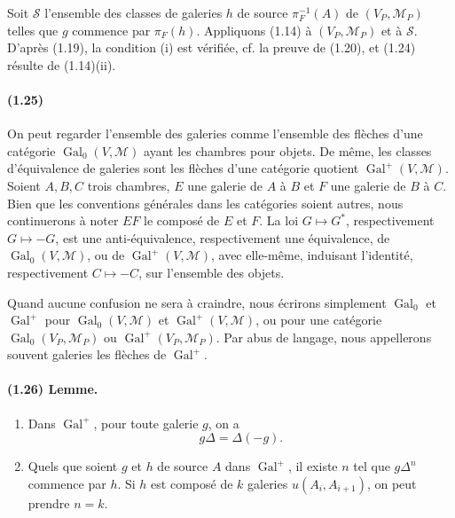 \documentclass[10pt]{article}
\begin{document}
Soit \(\mathcal S\) l'ensemble des classes de galeries \(h\) de source \(\pi_F^{-1}(A)\) de \((V_P,\mathcal M_P)\) telles que \(g\) commence par \(\pi_F(h)\). Appliquons (1.14) à \((V_P,\mathcal M_P)\) et à \(\mathcal S\). D'après (1.19), la condition (i) est vérifiée, cf. la preuve de (1.20), et (1.24) résulte de (1.14)(ii).

\paragraph{(1.25)} On peut regarder l'ensemble des galeries comme l'ensemble des flèches d'une catégorie \(\operatorname{Gal}_0(V,\mathcal M)\) ayant les chambres pour objets. De même, les classes d'équivalence de galeries sont les flèches d'une catégorie quotient \(\operatorname{Gal}^+(V,\mathcal M)\). Soient \(A,B,C\) trois chambres, \(E\) une galerie de \(A\) à \(B\) et \(F\) une galerie de \(B\) à \(C\). Bien que les conventions générales dans les catégories soient autres, nous continuerons à noter \(EF\) le composé de \(E\) et \(F\). La loi \(G\mapsto G^*\), respectivement \(G\mapsto -G\), est une anti-équivalence, respectivement une équivalence, de \(\operatorname{Gal}_0(V,\mathcal M)\), ou de \(\operatorname{Gal}^+(V,\mathcal M)\), avec elle-même, induisant l'identité, respectivement \(C\mapsto -C\), sur l'ensemble des objets.

Quand aucune confusion ne sera à craindre, nous écrirons simplement \(\operatorname{Gal}_0\) et \(\operatorname{Gal}^+\) pour \(\operatorname{Gal}_0(V,\mathcal M)\) et \(\operatorname{Gal}^+(V,\mathcal M)\), ou pour une catégorie \(\operatorname{Gal}_0(V_P,\mathcal M_P)\) ou \(\operatorname{Gal}^+(V_P,\mathcal M_P)\). Par abus de langage, nous appellerons souvent galeries les flèches de \(\operatorname{Gal}^+\).

\paragraph{(1.26) Lemme.}
\begin{enumerate}[label=(\roman*)]
\item Dans \(\operatorname{Gal}^+\), pour toute galerie \(g\), on a
\[
g\Delta=\Delta(-g).
\]
\item Quels que soient \(g\) et \(h\) de source \(A\) dans \(\operatorname{Gal}^+\), il existe \(n\) tel que \(g\Delta^n\) commence par \(h\). Si \(h\) est composé de \(k\) galeries \(u(A_i,A_{i+1})\), on peut prendre \(n=k\).
\end{enumerate}
\end{document}
